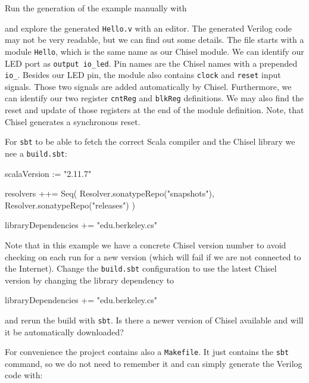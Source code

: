 \documentclass[%
    10pt, %
    headinclude, footexclude,
    openright, %
    notitlepage,
    cleardoubleempty,
    headsepline,
    pointlessnumbers,
    bibtotoc, idxtotoc,
    ]{scrbook}
\newcommand{\code}[1]{{\small{\texttt{#1}}}}
\begin{document}


\noindent Run the generation of the example manually with


and explore the generated \code{Hello.v} with an editor. The generated Verilog code may not be
very readable, but we can find out some details. The file starts with a module \code{Hello},
which is the same name as our Chisel module. We can identify our LED port as
\code{output io\_led}. Pin names are the Chisel names with a prepended \code{io\_}.
Besides our LED pin, the module also contains \code{clock} and \code{reset} input signals.
Those two signals are added automatically by Chisel.
Furthermore, we can identify our two register \code{cntReg} and \code{blkReg} definitions.
We may also find the reset and update of those registers at the end of the module definition.
Note, that Chisel generates a synchronous reset.

For \code{sbt} to be able to fetch the correct Scala compiler and the Chisel library
we nee a \code{build.sbt}:

\begin{chisel}
scalaVersion := "2.11.7"

resolvers ++= Seq(
  Resolver.sonatypeRepo("snapshots"),
  Resolver.sonatypeRepo("releases")
)

libraryDependencies += "edu.berkeley.cs" %
\end{chisel}

\noindent Note that in this example we have a concrete Chisel version number to avoid checking on
each run for a new version (which will fail if we are not connected to the Internet).
Change the \code{build.sbt} configuration to use the latest Chisel version by changing the
library dependency to

\begin{chisel}
libraryDependencies += "edu.berkeley.cs" %
\end{chisel}

\noindent and rerun the build with \code{sbt}. Is there a newer version of Chisel
available and will it be automatically downloaded?

For convenience the project contains also a \code{Makefile}.
It just contains the \code{sbt} command, so we do not need to remember it and
can simply generate the Verilog code with:
\end{document}
